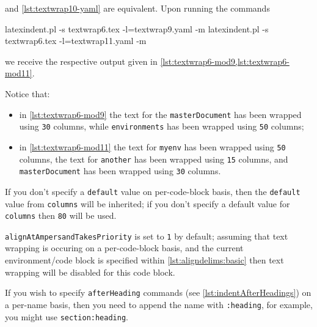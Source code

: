 	 and \cref{lst:textwrap10-yaml} are equivalent. Upon running
	the commands
	\begin{commandshell}
latexindent.pl -s textwrap6.tex -l=textwrap9.yaml -m
latexindent.pl -s textwrap6.tex -l=textwrap11.yaml -m
    \end{commandshell}
	we receive the respective output given in \cref{lst:textwrap6-mod9,lst:textwrap6-mod11}.

	\begin{widepage}

	\end{widepage}

	Notice that:
	\begin{itemize}
		\item in \cref{lst:textwrap6-mod9} the text for the \texttt{masterDocument} has been
		      wrapped using \texttt{30} columns, while \texttt{environments} has
		      been wrapped using \texttt{50} columns;
		\item in \cref{lst:textwrap6-mod11} the text for \texttt{myenv} has been wrapped
		      using \texttt{50} columns, the text for \texttt{another} has
		      been wrapped using \texttt{15} columns, and \texttt{masterDocument}
		      has been wrapped using \texttt{30} columns.
	\end{itemize}
	If you don't specify a \texttt{default} value on per-code-block basis, then
	the \texttt{default} value from \texttt{columns} will be inherited;
	if you don't specify a default value for \texttt{columns} then
	\texttt{80} will be used.

	\texttt{alignAtAmpersandTakesPriority} is set to \texttt{1} by default; assuming
	that text wrapping is occuring on a per-code-block basis, and the current
	environment/code block is specified within \vref{lst:aligndelims:basic} then text wrapping
	will be disabled for this code block.

	If you wish to specify \texttt{afterHeading} commands (see
	\vref{lst:indentAfterHeadings}) on a per-name basis, then you need to  append the name with
	\texttt{:heading}, for example, you might use \texttt{section:heading}.

